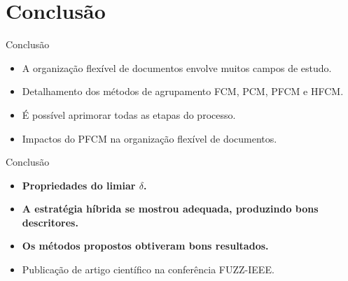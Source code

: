 \documentclass[brazil]{beamer}
\begin{document}
\section{Conclusão}

\begin{frame}{Conclusão}
  \begin{itemize}
    \item<1 -> A organização flexível de documentos envolve muitos campos de estudo.
    \item<2 -> Detalhamento dos métodos de agrupamento FCM, PCM, PFCM e HFCM.
    \item<3 -> É possível aprimorar todas as etapas do processo.
    \item<4 -> Impactos do PFCM na organização flexível de documentos.
  \end{itemize}
\end{frame}

\begin{frame}{Conclusão}
  \begin{itemize}
    \item<1 -> \textbf{Propriedades do limiar $\delta$.}
    \item<2 -> \textbf{A estratégia híbrida se mostrou adequada, produzindo bons descritores.}
    \item<3 -> \textbf{Os métodos propostos obtiveram bons resultados.}
    \item<4 -> Publicação de artigo científico na conferência FUZZ-IEEE.
  \end{itemize}
\end{frame}

%
\end{document}
